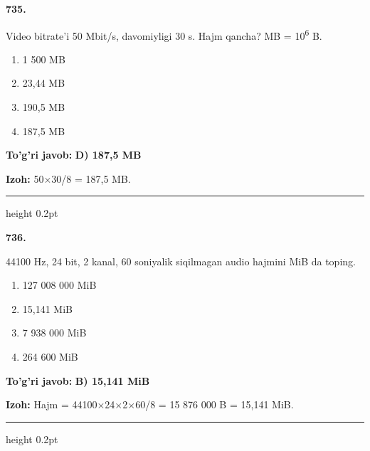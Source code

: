 \documentclass[10pt,a4paper,oneside]{article}
\begin{document}
\noindent\textbf{\color{ink}735.}
\par
Video bitrate'i 50 Mbit/s, davomiyligi 30 s. Hajm qancha? MB = 10\textsuperscript{6} B.
\begin{enumerate}[label=\Alph*),leftmargin=9mm]
\item 1 500 MB
\item 23,44 MB
\item 190,5 MB
\item 187,5 MB
\end{enumerate}
\begin{tcolorbox}[enhanced,breakable,colback=teal!4,colframe=teal!50!black,boxrule=0.5pt,arc=1.1mm,left=3mm,right=3mm,top=1.7mm,bottom=1.7mm,before skip=2mm,after skip=2mm]
\textbf{\color{teal}To'g'ri javob:} \textbf{D) 187,5 MB}
\par\smallskip
\textbf{Izoh:} 50\ensuremath{\times}30/8 = 187,5 MB.
\end{tcolorbox}
\vspace{2mm}\hrule height 0.2pt \vspace{3mm}

\noindent\textbf{\color{ink}736.}
\par
44100 Hz, 24 bit, 2 kanal, 60 soniyalik siqilmagan audio hajmini MiB da toping.
\begin{enumerate}[label=\Alph*),leftmargin=9mm]
\item 127 008 000 MiB
\item 15,141 MiB
\item 7 938 000 MiB
\item 264 600 MiB
\end{enumerate}
\begin{tcolorbox}[enhanced,breakable,colback=teal!4,colframe=teal!50!black,boxrule=0.5pt,arc=1.1mm,left=3mm,right=3mm,top=1.7mm,bottom=1.7mm,before skip=2mm,after skip=2mm]
\textbf{\color{teal}To'g'ri javob:} \textbf{B) 15,141 MiB}
\par\smallskip
\textbf{Izoh:} Hajm = 44100\ensuremath{\times}24\ensuremath{\times}2\ensuremath{\times}60/8 = 15 876 000 B = 15,141 MiB.
\end{tcolorbox}
\vspace{2mm}\hrule height 0.2pt \vspace{3mm}
\end{document}
